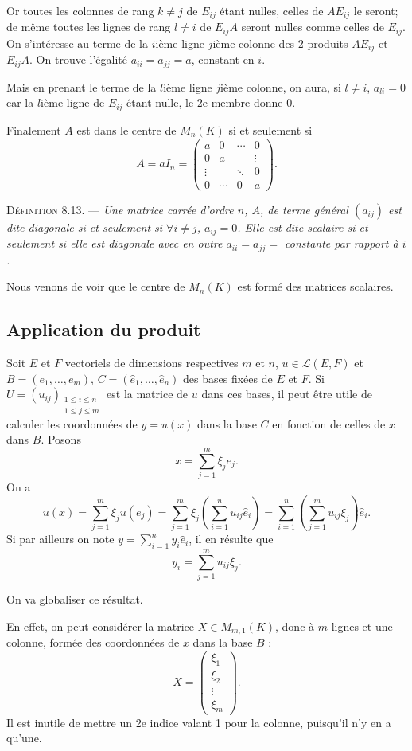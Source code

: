 Or toutes les colonnes de rang $k\ne j$ de $E_{ij}$ étant nulles, celles de $AE_{ij}$ le seront; de même toutes les lignes de rang $l\ne i$ de $E_{ij}A$ seront nulles comme celles de $E_{ij}$. On s'intéresse au terme de la $i$ième ligne $j$ième colonne des 2 produits $AE_{ij}$ et $E_{ij}A$. On trouve l'égalité $a_{ii}=a_{jj}=a$, constant en $i$.

Mais en prenant le terme de la $l$ième ligne $j$ième colonne, on aura, si $l\ne i$, $a_{li}=0$ car la $l$ième ligne de $E_{ij}$ étant nulle, le 2e membre donne 0.

Finalement $A$ est dans le centre de $M_n(K)$ si et seulement si
\[
A=aI_n=\begin{pmatrix}
a&0&\cdots&0\\0&a&&\vdots\\\vdots&&\ddots&0\\0&\cdots&0&a
\end{pmatrix}.
\]

\medskip\noindent\textsc{Définition 8.13.} --- \emph{Une matrice carrée d'ordre $n$, $A$, de terme général $(a_{ij})$ est dite diagonale si et seulement si $\forall i\ne j$, $a_{ij}=0$. Elle est dite scalaire si et seulement si elle est diagonale avec en outre $a_{ii}=a_{jj}=$ constante par rapport à $i$.}

Nous venons de voir que le centre de $M_n(K)$ est formé des matrices scalaires. \bookend

\subsection*{Application du produit}

Soit $E$ et $F$ vectoriels de dimensions respectives $m$ et $n$, $u\in\mathcal L(E,F)$ et $B=(e_1,\ldots,e_m)$, $C=(\hat e_1,\ldots,\hat e_n)$ des bases fixées de $E$ et $F$. Si $U=(u_{ij})_{\substack{1\le i\le n\\1\le j\le m}}$ est la matrice de $u$ dans ces bases, il peut être utile de calculer les coordonnées de $y=u(x)$ dans la base $C$ en fonction de celles de $x$ dans $B$. Posons
\[
x=\sum_{j=1}^m\xi_j e_j.
\]
On a
\[
u(x)=\sum_{j=1}^m\xi_j u(e_j)
=\sum_{j=1}^m\xi_j\left(\sum_{i=1}^n u_{ij}\hat e_i\right)
=\sum_{i=1}^n\left(\sum_{j=1}^m u_{ij}\xi_j\right)\hat e_i.
\]
Si par ailleurs on note $y=\sum_{i=1}^n y_i\hat e_i$, il en résulte que
\[
y_i=\sum_{j=1}^m u_{ij}\xi_j.
\]

On va globaliser ce résultat.

En effet, on peut considérer la matrice $X\in M_{m,1}(K)$, donc à $m$ lignes et une colonne, formée des coordonnées de $x$ dans la base $B$ :
\[
X=\begin{pmatrix}\xi_1\\\xi_2\\\vdots\\\xi_m\end{pmatrix}.
\]
Il est inutile de mettre un 2e indice valant 1 pour la colonne, puisqu'il n'y en a qu'une.

